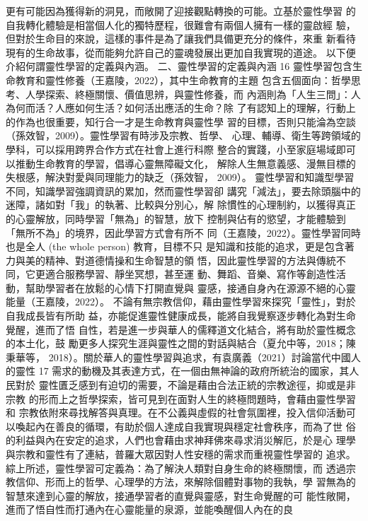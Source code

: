 更有可能因為獲得新的洞見，而敞開了迎接觀點轉換的可能。立基於靈性學習
的自我轉化體驗是相當個人化的獨特歷程，很難會有兩個人擁有一樣的靈啟經
驗，但對於生命目的來說，這樣的事件是為了讓我們具備更充分的條件，來重
新看待現有的生命故事，從而能夠允許自己的靈魂發展出更加自我實現的道途。
以下便介紹何謂靈性學習的定義與內涵。 
二、靈性學習的定義與內涵 
16 
靈性學習包含生命教育和靈性修養（王嘉陵，2022），其中生命教育的主題
包含五個面向：哲學思考、人學探索、終極關懷、價值思辨，與靈性修養，而
內涵則為「人生三問」：人為何而活？人應如何生活？如何活出應活的生命？除
了有認知上的理解，行動上的作為也很重要，知行合一才是生命教育與靈性學
習的目標，否則只能淪為空談（孫效智，2009）。靈性學習有時涉及宗教、哲學、
心理、輔導、衛生等跨領域的學科，可以採用跨界合作方式在社會上進行科際
整合的實踐，小至家庭場域即可以推動生命教育的學習，倡導心靈無障礙文化，
解除人生無意義感、漫無目標的失根感，解決對愛與同理能力的缺乏（孫效智，
2009）。 
靈性學習和知識型學習不同，知識學習強調資訊的累加，然而靈性學習卻
講究「減法」，要去除頭腦中的迷障，諸如對「我」的執著、比較與分別心，解
除慣性的心理制約，以獲得真正的心靈解放，同時學習「無為」的智慧，放下
控制與佔有的慾望，才能體驗到「無所不為」的境界，因此學習方式會有所不
同（王嘉陵，2022）。靈性學習同時也是全人 (the whole person) 教育，目標不只
是知識和技能的追求，更是包含著力與美的精神、對道德情操和生命智慧的領
悟，因此靈性學習的方法與傳統不同，它更適合服務學習、靜坐冥想，甚至運
動、舞蹈、音樂、寫作等創造性活動，幫助學習者在放鬆的心情下打開直覺與
靈感，接通自身內在源源不絕的心靈能量（王嘉陵，2022）。 
不論有無宗教信仰，藉由靈性學習來探究「靈性」，對於自我成長皆有所助
益，亦能促進靈性健康成長，能將自我覺察逐步轉化為對生命覺醒，進而了悟
自性，若是進一步與華人的儒釋道文化結合，將有助於靈性概念的本土化，鼓
勵更多人探究生涯與靈性之間的對話與結合（夏允中等，2018；陳秉華等，
2018）。關於華人的靈性學習與追求，有袁廣義（2021）討論當代中國人的靈性
17 
需求的動機及其表達方式，在一個由無神論的政府所統治的國家，其人民對於
靈性匱乏感到有迫切的需要，不論是藉由合法正統的宗教途徑，抑或是非宗教
的形而上之哲學探索，皆可見到在面對人生的終極問題時，會藉由靈性學習和
宗教依附來尋找解答與真理。在不公義與虛假的社會氛圍裡，投入信仰活動可
以喚起內在善良的循環，有助於個人達成自我實現與穩定社會秩序，而為了世
俗的利益與內在安定的追求，人們也會藉由求神拜佛來尋求消災解厄，於是心
理學與宗教和靈性有了連結，普羅大眾因對人性安穩的需求而重視靈性學習的
追求。 
綜上所述，靈性學習可定義為：為了解決人類對自身生命的終極關懷，而
透過宗教信仰、形而上的哲學、心理學的方法，來解除個體對事物的我執，學
習無為的智慧來達到心靈的解放，接通學習者的直覺與靈感，對生命覺醒的可
能性敞開，進而了悟自性而打通內在心靈能量的泉源，並能喚醒個人內在的良
